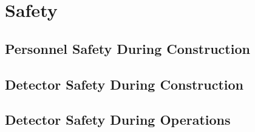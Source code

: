\section{Safety}
\label{sec:fdsp-tpcelec-safety}

\subsection{Personnel Safety During Construction}
\label{sec:fdsp-tpcelec-safety-personnel}

\subsection{Detector Safety During Construction}
\label{sec:fdsp-tpcelec-safety-detcon}

\subsection{Detector Safety During Operations}
\label{sec:fdsp-tpcelec-safety-detops}
